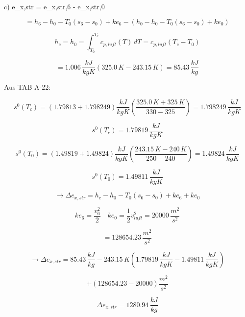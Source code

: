 c) \quad \Delta e_{x,str} = e_{x,str,6} - e_{x,str,0}

\[
= h_6 - h_0 - T_0 (s_6 - s_0) + ke_6 - \left( h_0 - h_0 - T_0 \left( s_6 - s_0 \right) + ke_0 \right)
\]

\[
h_c = h_0 = \int_{T_0}^{T_c} c_{p,luft} (T) \, dT = c_{p,luft} (T_c - T_0)
\]

\[
= 1.006 \, \frac{kJ}{kgK} \left( 325.0 \, K - 243.15 \, K \right) = 85.43 \, \frac{kJ}{kg}
\]

Aus TAB A-22:

\[
s^0 (T_c) = \left( 1.79813 + 1.798249 \right) \frac{kJ}{kgK} \left( \frac{325.0 \, K + 325 \, K}{330 - 325} \right) = 1.798249 \, \frac{kJ}{kgK}
\]

\[
s^0 (T_c) = 1.79819 \, \frac{kJ}{kgK}
\]

\[
s^0 (T_0) = \left( 1.49819 + 1.49824 \right) \frac{kJ}{kgK} \left( \frac{243.15 \, K - 240 \, K}{250 - 240} \right) = 1.49824 \, \frac{kJ}{kgK}
\]

\[
s^0 (T_0) = 1.49811 \, \frac{kJ}{kgK}
\]

\[
\rightarrow \Delta e_{x,str} = h_c - h_0 - T_0 (s_6 - s_0) + ke_6 + ke_0
\]

\[
ke_6 = \frac{v_6^2}{2} \quad ke_0 = \frac{1}{2} v_{luft}^2 = 20000 \, \frac{m^2}{s^2}
\]

\[
= 128654.23 \, \frac{m^2}{s^2}
\]

\[
\rightarrow \Delta e_{x,str} = 85.43 \, \frac{kJ}{kg} - 243.15 \, K \left( 1.79819 \, \frac{kJ}{kgK} - 1.49811 \, \frac{kJ}{kgK} \right)
\]

\[
+ \left( 128654.23 - 20000 \right) \frac{m^2}{s^2}
\]

\[
\Delta e_{x,str} = 1280.94 \, \frac{kJ}{kg}
\]
